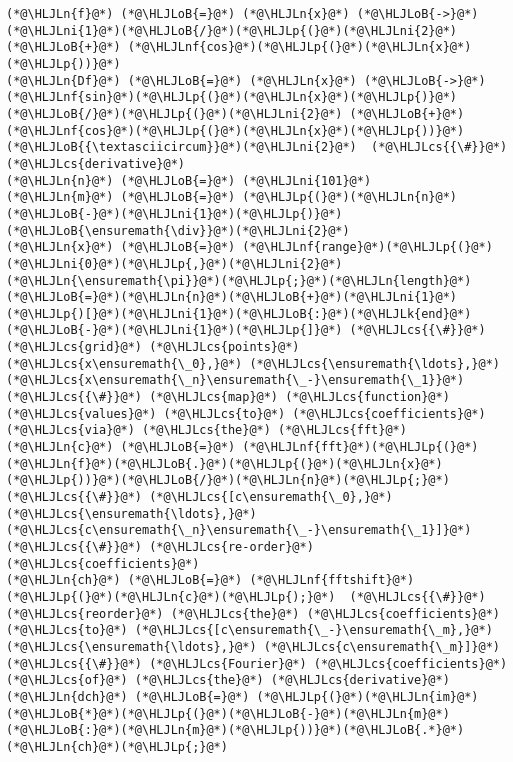 \documentclass[12pt,landscape]{article}
\newcommand{\HLJLk}[1]{\textcolor[RGB]{148,91,176}{\textbf{#1}}}
\newcommand{\HLJLn}[1]{#1}
\newcommand{\HLJLnf}[1]{\textcolor[RGB]{66,102,213}{#1}}
\newcommand{\HLJLni}[1]{\textcolor[RGB]{59,151,46}{#1}}
\newcommand{\HLJLoB}[1]{\textcolor[RGB]{102,102,102}{\textbf{#1}}}
\newcommand{\HLJLp}[1]{#1}
\newcommand{\HLJLcs}[1]{\textcolor[RGB]{153,153,119}{\textit{#1}}}
\begin{document}
{\begin{lstlisting}
(*@\HLJLn{f}@*) (*@\HLJLoB{=}@*) (*@\HLJLn{x}@*) (*@\HLJLoB{->}@*) (*@\HLJLni{1}@*)(*@\HLJLoB{/}@*)(*@\HLJLp{(}@*)(*@\HLJLni{2}@*) (*@\HLJLoB{+}@*) (*@\HLJLnf{cos}@*)(*@\HLJLp{(}@*)(*@\HLJLn{x}@*)(*@\HLJLp{))}@*)
(*@\HLJLn{Df}@*) (*@\HLJLoB{=}@*) (*@\HLJLn{x}@*) (*@\HLJLoB{->}@*) (*@\HLJLnf{sin}@*)(*@\HLJLp{(}@*)(*@\HLJLn{x}@*)(*@\HLJLp{)}@*)(*@\HLJLoB{/}@*)(*@\HLJLp{(}@*)(*@\HLJLni{2}@*) (*@\HLJLoB{+}@*) (*@\HLJLnf{cos}@*)(*@\HLJLp{(}@*)(*@\HLJLn{x}@*)(*@\HLJLp{))}@*)(*@\HLJLoB{{\textasciicircum}}@*)(*@\HLJLni{2}@*)  (*@\HLJLcs{{\#}}@*) (*@\HLJLcs{derivative}@*)
(*@\HLJLn{n}@*) (*@\HLJLoB{=}@*) (*@\HLJLni{101}@*)
(*@\HLJLn{m}@*) (*@\HLJLoB{=}@*) (*@\HLJLp{(}@*)(*@\HLJLn{n}@*)(*@\HLJLoB{-}@*)(*@\HLJLni{1}@*)(*@\HLJLp{)}@*)(*@\HLJLoB{\ensuremath{\div}}@*)(*@\HLJLni{2}@*)
(*@\HLJLn{x}@*) (*@\HLJLoB{=}@*) (*@\HLJLnf{range}@*)(*@\HLJLp{(}@*)(*@\HLJLni{0}@*)(*@\HLJLp{,}@*)(*@\HLJLni{2}@*)(*@\HLJLn{\ensuremath{\pi}}@*)(*@\HLJLp{;}@*)(*@\HLJLn{length}@*)(*@\HLJLoB{=}@*)(*@\HLJLn{n}@*)(*@\HLJLoB{+}@*)(*@\HLJLni{1}@*)(*@\HLJLp{)[}@*)(*@\HLJLni{1}@*)(*@\HLJLoB{:}@*)(*@\HLJLk{end}@*)(*@\HLJLoB{-}@*)(*@\HLJLni{1}@*)(*@\HLJLp{]}@*) (*@\HLJLcs{{\#}}@*) (*@\HLJLcs{grid}@*) (*@\HLJLcs{points}@*) (*@\HLJLcs{x\ensuremath{\_0},}@*) (*@\HLJLcs{\ensuremath{\ldots},}@*) (*@\HLJLcs{x\ensuremath{\_n}\ensuremath{\_-}\ensuremath{\_1}}@*)
(*@\HLJLcs{{\#}}@*) (*@\HLJLcs{map}@*) (*@\HLJLcs{function}@*) (*@\HLJLcs{values}@*) (*@\HLJLcs{to}@*) (*@\HLJLcs{coefficients}@*) (*@\HLJLcs{via}@*) (*@\HLJLcs{the}@*) (*@\HLJLcs{fft}@*)
(*@\HLJLn{c}@*) (*@\HLJLoB{=}@*) (*@\HLJLnf{fft}@*)(*@\HLJLp{(}@*)(*@\HLJLn{f}@*)(*@\HLJLoB{.}@*)(*@\HLJLp{(}@*)(*@\HLJLn{x}@*)(*@\HLJLp{))}@*)(*@\HLJLoB{/}@*)(*@\HLJLn{n}@*)(*@\HLJLp{;}@*) (*@\HLJLcs{{\#}}@*) (*@\HLJLcs{[c\ensuremath{\_0},}@*) (*@\HLJLcs{\ensuremath{\ldots},}@*) (*@\HLJLcs{c\ensuremath{\_n}\ensuremath{\_-}\ensuremath{\_1}]}@*)
(*@\HLJLcs{{\#}}@*) (*@\HLJLcs{re-order}@*) (*@\HLJLcs{coefficients}@*)
(*@\HLJLn{ch}@*) (*@\HLJLoB{=}@*) (*@\HLJLnf{fftshift}@*)(*@\HLJLp{(}@*)(*@\HLJLn{c}@*)(*@\HLJLp{);}@*)  (*@\HLJLcs{{\#}}@*) (*@\HLJLcs{reorder}@*) (*@\HLJLcs{the}@*) (*@\HLJLcs{coefficients}@*) (*@\HLJLcs{to}@*) (*@\HLJLcs{[c\ensuremath{\_-}\ensuremath{\_m},}@*) (*@\HLJLcs{\ensuremath{\ldots},}@*) (*@\HLJLcs{c\ensuremath{\_m}]}@*)
(*@\HLJLcs{{\#}}@*) (*@\HLJLcs{Fourier}@*) (*@\HLJLcs{coefficients}@*) (*@\HLJLcs{of}@*) (*@\HLJLcs{the}@*) (*@\HLJLcs{derivative}@*)
(*@\HLJLn{dch}@*) (*@\HLJLoB{=}@*) (*@\HLJLp{(}@*)(*@\HLJLn{im}@*)(*@\HLJLoB{*}@*)(*@\HLJLp{(}@*)(*@\HLJLoB{-}@*)(*@\HLJLn{m}@*)(*@\HLJLoB{:}@*)(*@\HLJLn{m}@*)(*@\HLJLp{))}@*)(*@\HLJLoB{.*}@*)(*@\HLJLn{ch}@*)(*@\HLJLp{;}@*)

\end{lstlisting}}
\end{document}
